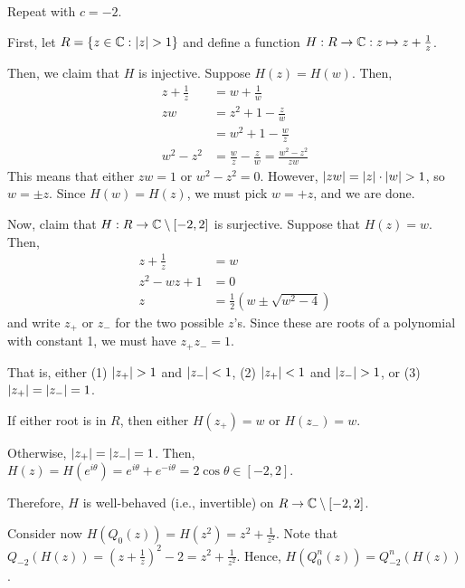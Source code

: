 \documentclass[class=pmath370,tikz,notes]{agony}
\begin{document}
\begin{example}\label{ex:k-2}
  Repeat with $c = -2$.
\end{example}
\begin{sol}
  First, let $R = \{z \in \mathbb{C} : \abs{z} > 1\}$
  and define a function $H : R \to \mathbb{C} : z \mapsto z + \frac{1}{z}$.

  Then, we claim that $H$ is injective. Suppose $H(z) = H(w)$. Then,
  \begin{align*}
    z + \frac1z & = w + \frac1w                                    \\
    zw          & = z^2 + 1 - \frac{z}{w}                          \\
                & = w^2 + 1 - \frac{w}{z}                          \\
    w^2 - z^2   & = \frac{w}{z} - \frac{z}{w} = \frac{w^2-z^2}{zw}
  \end{align*}
  This means that either $zw = 1$ or $w^2 - z^2 = 0$.
  However, $\abs{zw} = \abs{z}\cdot\abs{w} > 1$, so $w = \pm z$.
  Since $H(w) = H(z)$, we must pick $w = +z$, and we are done.

  Now, claim that $H : R \to \mathbb{C} \setminus [-2,2]$ is surjective.
  Suppose that $H(z) = w$. Then,
  \begin{align*}
    z + \frac1z  & = w                             \\
    z^2 - wz + 1 & = 0                             \\
    z            & = \frac12(w \pm \sqrt{w^2 - 4})
  \end{align*}
  and write $z_+$ or $z_-$ for the two possible $z$'s.
  Since these are roots of a polynomial with constant 1,
  we must have $z_+z_- = 1$.

  That is, either (1) $\abs{z_+} > 1$ and $\abs{z_-} < 1$,
  (2) $\abs{z_+} < 1$ and $\abs{z_-} > 1$,
  or (3) $\abs{z_+} = \abs{z_-} = 1$.

  If either root is in $R$, then either $H(z_+) = w$ or $H(z_-) = w$.

  Otherwise, $\abs{z_+} = \abs{z_-} = 1$.
  Then, $H(z) = H(e^{i\theta}) = e^{i\theta} + e^{-i\theta} = 2\cos\theta \in [-2,2]$.

  Therefore, $H$ is well-behaved (i.e., invertible) on $R \to \mathbb{C} \setminus [-2,2]$.

  Consider now $H(Q_0(z)) = H(z^2) = z^2 + \frac{1}{z^2}$.
  Note that $Q_{-2}(H(z)) = (z+\frac{1}{z})^2 - 2 = z^2+\frac{1}{z^2}$.
  Hence, $H(Q_0^n(z)) = Q_{-2}^n(H(z))$.


\end{sol}
\end{document}
